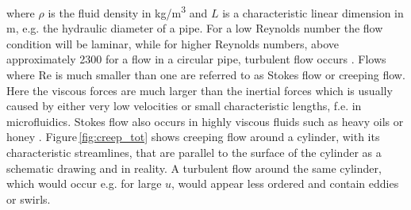 where $\rho$ is the fluid density in kg/m\textsuperscript{3} and $L$ is a characteristic linear dimension in m, e.g. the hydraulic diameter of a pipe. For a low Reynolds number the flow condition will be laminar, while for higher Reynolds numbers, above approximately 2300 for a flow in a circular pipe, turbulent flow occurs \cite{schwarze2012cfd}. Flows where Re is much smaller than one are referred to as Stokes flow or creeping flow. Here the viscous forces are much larger than the inertial forces which is usually caused by either very low velocities or small characteristic lengths, f.e. in microfluidics. Stokes flow also occurs in highly viscous fluids such as heavy oils or honey \cite{lautrup2004physics}. Figure\,\ref{fig:creep_tot} shows creeping flow around a cylinder, with its characteristic streamlines, that are parallel to the surface of the cylinder as a schematic drawing and in reality. A turbulent flow around the same cylinder, which would occur e.g. for large $u$, would appear less ordered and contain eddies or swirls.
